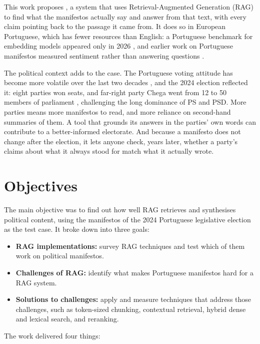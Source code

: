 This work proposes \sysname{}, a system that uses Retrieval-Augmented Generation (RAG) \citep{rag-nlp} to find what the manifestos actually say and answer from that text, with every claim pointing back to the passage it came from. It does so in European Portuguese, which has fewer resources than English: a Portuguese benchmark for embedding models appeared only in 2026 \citep{okamura2026mtebpt}, and earlier work on Portuguese manifestos measured sentiment rather than answering questions \citep{marino-etal-2024-decoding}.

The political context adds to the case. The Portuguese voting attitude has become more volatile over the last two decades \citep{eleitorado}, and the 2024 election reflected it: eight parties won seats, and far-right party Chega went from 12 to 50 members of parliament \citep{cne2024mapa}, challenging the long dominance of PS and PSD. More parties means more manifestos to read, and more reliance on second-hand summaries of them. A tool that grounds its answers in the parties' own words can contribute to a better-informed electorate. And because a manifesto does not change after the election, it lets anyone check, years later, whether a party's claims about what it always stood for match what it actually wrote.

\section{Objectives}

The main objective was to find out how well RAG retrieves and synthesises political content, using the manifestos of the 2024 Portuguese legislative election as the test case. It broke down into three goals:

\begin{itemize}
    \item \textbf{RAG implementations:} survey RAG techniques and test which of them work on political manifestos.
    \item \textbf{Challenges of RAG:} identify what makes Portuguese manifestos hard for a RAG system.
    \item \textbf{Solutions to challenges:} apply and measure techniques that address those challenges, such as token-sized chunking, contextual retrieval, hybrid dense and lexical search, and reranking.
\end{itemize}

The work delivered four things:

